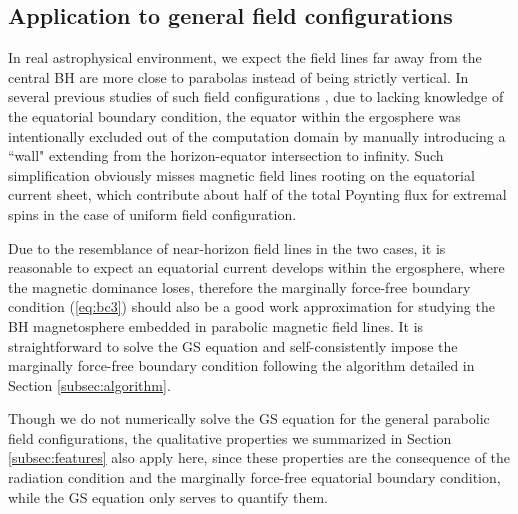 \documentclass[aps,prd,reprint,nofootinbib, superscriptaddress]{revtex4-1}
\begin{document}
\subsection{Application to general field configurations}
In real astrophysical environment, we expect the field lines far away from the central BH
are more close to parabolas instead of being strictly vertical. In several previous studies of such field
configurations \cite[e.g.][]{Tchekhovskoy2010,Nathanail2014,Mahlmann2018},
due to lacking knowledge of the equatorial boundary condition, the
equator within the ergosphere was intentionally excluded out of the computation domain by manually
introducing a ``wall" extending from the horizon-equator intersection to infinity. Such
simplification obviously misses magnetic field lines rooting on the
equatorial current sheet, which contribute about half of the total Poynting flux for extremal spins in
the case of uniform field configuration.

Due to the resemblance of near-horizon field lines in the two cases,
it is reasonable to expect an equatorial current develops within the ergosphere,
where the magnetic dominance loses, therefore the marginally force-free boundary
condition (\ref{eq:bc3}) should also be a good work approximation for studying
the BH magnetosphere embedded in parabolic magnetic field lines.
It is straightforward to solve the GS equation and self-consistently
impose the marginally force-free boundary condition following the
algorithm detailed in Section \ref{subsec:algorithm}.

Though we do not numerically solve the GS equation for the general parabolic field configurations,
the qualitative properties we summarized in Section \ref{subsec:features} also apply here,
since these properties are the consequence of the radiation condition and the marginally force-free equatorial boundary condition,
while the GS equation only serves to quantify them.
\end{document}
